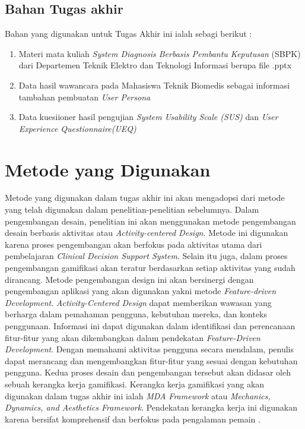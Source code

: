 \subsection{Bahan Tugas akhir}
Bahan yang digunakan untuk Tugas Akhir ini ialah sebagi berikut :
\begin{enumerate}
	\item Materi mata kuliah \textit{System Diagnosis Berbasis Pembantu Keputusan} (SBPK) dari Departemen Teknik Elektro dan Teknologi Informasi berupa file .pptx
	\item Data hasil wawancara pada Mahasiswa Teknik Biomedis sebagai informasi tambahan pembuatan \textit{User Persona}
	\item Data kuesiioner hasil pengujian \textit{System Usability Scale (SUS)} dan \textit{User Experience Questionnaire(UEQ)}
\end{enumerate}


\section{Metode yang Digunakan}
Metode yang digunakan dalam tugas akhir ini akan mengadopsi dari metode yang telah digunakan dalam penelitian-penelitian sebelumnya.
Dalam pengembangan desain, penelitian ini akan menggunakan metode pengembangan desain berbasis aktivitas atau \textit{Activity-centered Design}.
Metode ini digunakan karena proses pengembangan akan berfokus pada aktivitas utama dari pembelajaran \textit{Clinical Decision Support System}.
Selain itu juga, dalam proses pengembangan gamifikasi akan teratur berdasarkan setiap aktivitas yang sudah dirancang.
Metode pengembangan design ini akan bersinergi dengan pengembangan aplikasi yang akan digunakan yakni metode \textit{Feature-driven Development}.
\textit{Activity-Centered Design} dapat memberikan wawasan yang berharga dalam pemahaman pengguna, kebutuhan mereka, dan konteks penggunaan. 
Informasi ini dapat digunakan dalam identifikasi dan perencanaan fitur-fitur yang akan dikembangkan dalam pendekatan \textit{Feature-Driven Development}. 
Dengan memahami aktivitas pengguna secara mendalam, penulis dapat merancang dan mengembangkan fitur-fitur yang sesuai dengan kebutuhan pengguna.
Kedua proses desain dan pengembangan tersebut akan didasar oleh sebuah kerangka kerja gamifikasi. 
Kerangka kerja gamifikasi yang akan digunakan dalam tugas akhir ini ialah \textit{MDA Framework} atau \textit{Mechanics, Dynamics, and Aesthetics Framework}.
Pendekatan kerangka kerja ini digunakan karena bersifat komprehensif dan berfokus pada pengalaman pemain \cite{marisa2020gamifikasi}.

